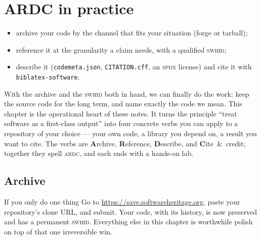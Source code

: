 \chapter{ARDC in practice}
\label{ch:ardc}


\begin{objectives}\small
\begin{itemize}[nosep,leftmargin=*]
  \item archive your code by the channel that fits your situation (forge or tarball);
  \item reference it at the granularity a claim needs, with a qualified \textsc{swhid};
  \item describe it (\texttt{codemeta.json}, \texttt{CITATION.cff}, an \textsc{spdx} license)
        and cite it with \texttt{biblatex-software}.
\end{itemize}
\end{objectives}

With the archive and the \textsc{swhid} both in hand, we can finally do the work: keep the
source code for the long term, and name exactly the code we mean. This chapter is the
operational heart of these notes. It turns the principle ``treat software as a first-class output''
into four concrete verbs you can apply to a repository of your choice --- your own code, a library
you depend on, a result you want to cite. The verbs are \textbf{A}rchive, \textbf{R}eference,
\textbf{D}escribe, and \textbf{C}ite~\&~credit; together they spell \textsc{ardc}, and each ends
with a hands-on lab.

\section{Archive}

\begin{callout}{If you only do one thing}
Go to \url{https://save.softwareheritage.org}, paste your repository's clone URL, and submit. Your
code, with its history, is now preserved and has a permanent \textsc{swhid}. Everything else in this
chapter is worthwhile polish on top of that one irreversible win.
\end{callout}

